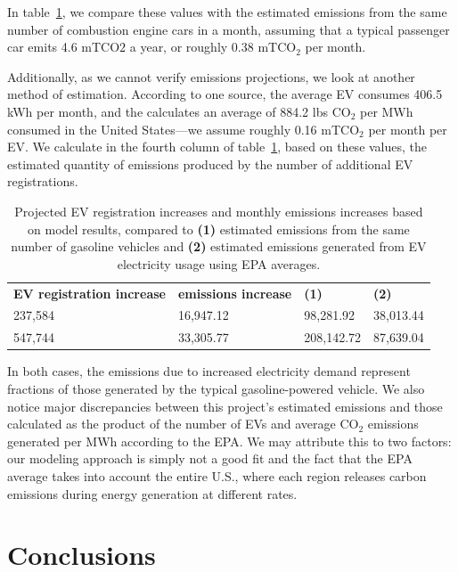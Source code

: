 \documentclass{article}
\begin{document}
In table~\ref{table:emissionscomp}, we compare these values with the estimated emissions from the same number of combustion engine cars in a month, assuming that a typical passenger car emits 4.6 mTCO\(2\) a year, or roughly 0.38 mTCO\(_2\) per month. \citep{caremissions}

Additionally, as we cannot verify emissions projections, we look at another method of estimation. According to one source, \citep{evconsumption} the average EV consumes 406.5 kWh per month, and the \cite{emissionspermwh} calculates an average of 884.2 lbs CO\(_2\) per MWh consumed in the United States---we assume roughly 0.16 mTCO\(_2\) per month per EV. We calculate in the fourth column of table~\ref{table:emissionscomp}, based on these values, the estimated quantity of emissions produced by the number of additional EV registrations.

\begin{table}
    \begin{tabular}{p{4cm}p{4cm}p{2cm}p{2cm}}
        \textbf{EV registration increase} & \textbf{emissions increase} & \textbf{(1)} & \textbf{(2)}\\
         237,584 & 16,947.12 & 98,281.92 & 38,013.44\\
         547,744 & 33,305.77 & 208,142.72 & 87,639.04
    \end{tabular}
    \caption{Projected EV registration increases and monthly emissions increases based on model results, compared to \textbf{(1)} estimated emissions from the same number of gasoline vehicles and \textbf{(2)} estimated emissions generated from EV electricity usage using EPA averages.}
    \label{table:emissionscomp}
\end{table}

In both cases, the emissions due to increased electricity demand represent fractions of those generated by the typical gasoline-powered vehicle. We also notice major discrepancies between this project's estimated emissions and those calculated as the product of the number of EVs and average CO\(_2\) emissions generated per MWh according to the EPA. We may attribute this to two factors: our modeling approach is simply not a good fit and the fact that the EPA average takes into account the entire U.S., where each region releases carbon emissions during energy generation at different rates.

\section{Conclusions}
\end{document}
